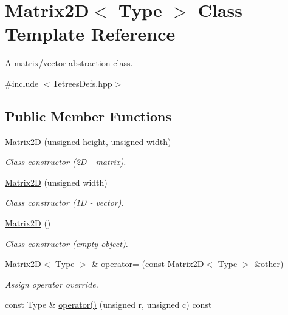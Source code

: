 \hypertarget{classMatrix2D}{}\section{Matrix2D$<$ Type $>$ Class Template Reference}
\label{classMatrix2D}


A matrix/vector abstraction class.  




{\ttfamily \#include $<$Tetrees\+Defs.\+hpp$>$}

\subsection*{Public Member Functions}
\begin{DoxyCompactItemize}
\item 
\mbox{\hyperlink{classMatrix2D_a6166db3bae116e2f009721534abdb2de}{Matrix2D}} (unsigned height, unsigned width)
\begin{DoxyCompactList}\small\item\em Class constructor (2D -\/ matrix). \end{DoxyCompactList}\item 
\mbox{\hyperlink{classMatrix2D_aab23e73fe109ec1eb39dc442bcb67cbe}{Matrix2D}} (unsigned width)
\begin{DoxyCompactList}\small\item\em Class constructor (1D -\/ vector). \end{DoxyCompactList}\item 
\mbox{\hyperlink{classMatrix2D_a5a6653f697f1c397669bd556c1fd272a}{Matrix2D}} ()
\begin{DoxyCompactList}\small\item\em Class constructor (empty object). \end{DoxyCompactList}\item 
\mbox{\label{classMatrix2D_a9c51e9afbf286db8aa8c08a523bbb46c}} 
\mbox{\hyperlink{classMatrix2D}{Matrix2D}}$<$ Type $>$ \& \mbox{\hyperlink{classMatrix2D_a9c51e9afbf286db8aa8c08a523bbb46c}{operator=}} (const \mbox{\hyperlink{classMatrix2D}{Matrix2D}}$<$ Type $>$ \&other)
\begin{DoxyCompactList}\small\item\em Assign operator override. \end{DoxyCompactList}\item 
const Type \& \mbox{\hyperlink{classMatrix2D_aa9a6df1e7cc653d635baedc659ea00f7}{operator()}} (unsigned r, unsigned c) const

\end{DoxyCompactItemize}
